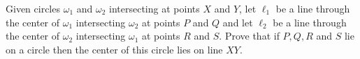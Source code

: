 Given circles $ \omega_1$ and $ \omega_2$ intersecting at points $ X$ and $ Y$,  let $ \ell_1$ be a line through the center of $ \omega_1$ intersecting $ \omega_2$ at points $ P$ and $ Q$ and let $ \ell_2$ be a line through the center of $ \omega_2$ intersecting $ \omega_1$ at points $ R$ and $ S$.  Prove that if $ P, Q, R$ and $ S$ lie on a circle then the center of this circle lies on line $ XY$.